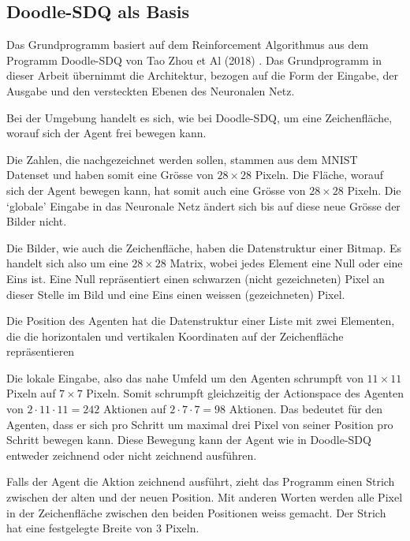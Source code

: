 \subsection*{Doodle-SDQ als Basis}
Das Grundprogramm basiert auf dem Reinforcement Algorithmus aus dem Programm
Doodle-SDQ von Tao Zhou et Al (2018) \cite{zhou_learning_2018}. Das
Grundprogramm in dieser Arbeit übernimmt die Architektur, bezogen auf die Form
der Eingabe, der Ausgabe und den versteckten Ebenen des Neuronalen Netz.

Bei der Umgebung handelt es sich, wie bei Doodle-SDQ, um eine Zeichenfläche,
worauf sich der Agent frei bewegen kann.

Die Zahlen, die nachgezeichnet werden sollen, stammen aus dem MNIST Datenset und
haben somit eine Grösse von $28\times28$ Pixeln. Die Fläche, worauf sich der Agent
bewegen kann, hat somit auch eine Grösse von $28\times28$ Pixeln. Die `globale' Eingabe
in das Neuronale Netz ändert sich bis auf diese neue Grösse der Bilder nicht.

Die Bilder, wie auch die Zeichenfläche, haben die Datenstruktur einer Bitmap. Es
handelt sich also um eine $28\times28$ Matrix, wobei jedes Element eine Null oder eine
Eins ist. Eine Null repräsentiert einen schwarzen (nicht gezeichneten) Pixel an dieser Stelle im Bild
und eine Eins einen weissen (gezeichneten) Pixel.

Die Position des Agenten hat die Datenstruktur einer Liste mit zwei Elementen,
die die horizontalen und vertikalen Koordinaten auf der Zeichenfläche
repräsentieren

Die lokale Eingabe, also das nahe Umfeld um den Agenten schrumpft von
$11\times11$ Pixeln auf $7\times7$ Pixeln. Somit schrumpft gleichzeitig der
Actionspace des Agenten von $2\cdot11\cdot11 = 242$ Aktionen auf $2\cdot7\cdot7
= 98$ Aktionen. Das bedeutet für den Agenten, dass er sich pro Schritt um
maximal drei Pixel von seiner Position pro Schritt bewegen kann. Diese Bewegung
kann der Agent wie in Doodle-SDQ entweder zeichnend oder nicht zeichnend
ausführen.

Falls der Agent die Aktion zeichnend ausführt, zieht das Programm einen Strich
zwischen der alten und der neuen Position. Mit anderen Worten werden alle Pixel
in der Zeichenfläche zwischen den beiden Positionen weiss gemacht. Der Strich
hat eine festgelegte Breite von $3$ Pixeln.

